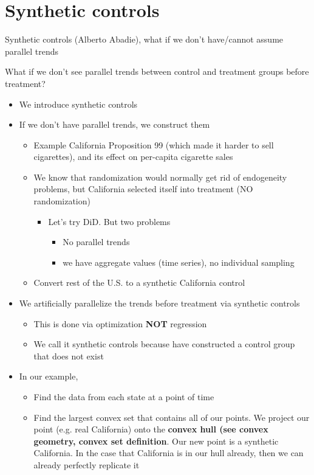 \documentclass[10pt, oneside]{article}
\begin{document}
\section{Synthetic controls}
Synthetic controls (Alberto Abadie), what if we don't have/cannot assume parallel trends

\vspace{0.15in}
What if we don't see parallel trends between control and treatment groups before treatment?
\begin{itemize}
    \item We introduce synthetic controls
    \item If we don't have parallel trends, we construct them
    \begin{itemize}
        \item Example California Proposition 99 (which made it harder to sell cigarettes), and its effect on per-capita cigarette sales
        \item We know that randomization would normally get rid of endogeneity problems, but California selected itself into treatment (NO randomization)
        \begin{itemize}
            \item Let's try DiD. But two problems
            \begin{itemize}
                \item No parallel trends
                \item we have aggregate values (time series), no individual sampling
            \end{itemize}
        \end{itemize}
        \item Convert rest of the U.S. to a synthetic California control
    \end{itemize}
    \item We artificially parallelize the trends before treatment via synthetic controls
    \begin{itemize}
        \item This is done via optimization \textbf{NOT} regression
        \item We call it synthetic controls because have constructed a control group that does not exist
    \end{itemize}
    \item In our example,
    \begin{itemize}
        \item Find the data from each state at a point of time
        \item Find the largest convex set that contains all of our points. We project our point (e.g. real California) onto the \textbf{convex hull (see convex geometry, convex set definition}. Our new point is a synthetic California. In the case that California is in our hull already, then we can already perfectly replicate it

\end{itemize}
\end{itemize}
\end{document}
